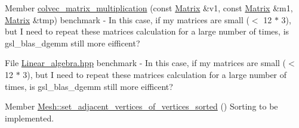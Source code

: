
\begin{DoxyRefList}
\item[Member \mbox{\hyperlink{Linear__algebra_8hpp_a71cbe43985593c79552d1e40002e5bbb}{colvec\+\_\+matrix\+\_\+multiplication}} (const \mbox{\hyperlink{classMatrix}{Matrix}} \&v1, const \mbox{\hyperlink{classMatrix}{Matrix}} \&m1, \mbox{\hyperlink{classMatrix}{Matrix}} \&tmp)]\label{todo__todo000002}%
%
benchmark -\/ In this case, if my matrices are small (\texorpdfstring{$<$}{<} 12 $\ast$ 3), but I need to repeat these matrices calculation for a large number of times, is gsl\+\_\+blas\+\_\+dgemm still more eifficent? 
\item[File \mbox{\hyperlink{Linear__algebra_8hpp}{Linear\+\_\+algebra.hpp}} ]\label{todo__todo000001}%
%
benchmark -\/ In this case, if my matrices are small (\texorpdfstring{$<$}{<} 12 $\ast$ 3), but I need to repeat these matrices calculation for a large number of times, is gsl\+\_\+blas\+\_\+dgemm still more eifficent? 
\item[Member \mbox{\hyperlink{classMesh_a3701b70db1a2940cbda09d8d8ae36dc0}{Mesh\+::set\+\_\+adjacent\+\_\+vertices\+\_\+of\+\_\+vertices\+\_\+sorted}} ()]\label{todo__todo000003}%
%
Sorting to be implemented.
\end{DoxyRefList}